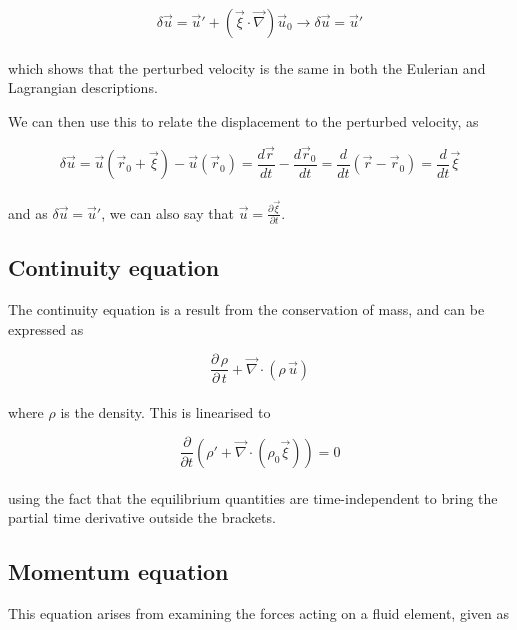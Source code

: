 \documentclass[11pt]{amsart}
\begin{document}
\begin{equation}
\delta \vec{u} = \vec{u}' + (\vec{\xi} \cdot \vec{\nabla}) \vec{u}_{0} \longrightarrow \delta \vec{u} = \vec{u}'
\end{equation}
\\
which shows that the perturbed velocity is the same in both the Eulerian and Lagrangian descriptions.

We can then use this to relate the displacement to the perturbed velocity, as

\begin{equation}
\delta \vec{u} = \vec{u}(\vec{r}_{0} + \vec{\xi}) - \vec{u}(\vec{r}_{0}) = \frac{d\vec{r}}{dt} - \frac{d\vec{r}_{0}}{dt}
= \frac{d}{dt} \left( \vec{r} - \vec{r}_{0} \right) = \frac{d}{dt} \vec{\xi}
\end{equation}
\\
and as $\delta\vec{u} = \vec{u}'$, we can also say that $\vec{u} = \frac{\partial \vec{\xi}}{\partial t}$.






\subsection{Continuity equation}

The continuity equation is a result from the conservation of mass, and can be expressed as

\begin{equation} \frac{\partial \, \rho}{\partial \, t} + \vec{\nabla} \cdot ( \rho \, \vec{u} )
\end{equation}
\\
where $\rho$ is the density.  This is linearised to

\begin{equation}
\frac{\partial}{\partial t} \left( \rho' + \vec{\nabla} \cdot \left( \rho_{0} \vec{\xi} \right) \right) = 0
\end{equation}
\\
using the fact that the equilibrium quantities are time-independent to bring the partial time
derivative outside the brackets.



\subsection{Momentum equation}

This equation arises from examining the forces acting on a fluid element, given as
\end{document}
